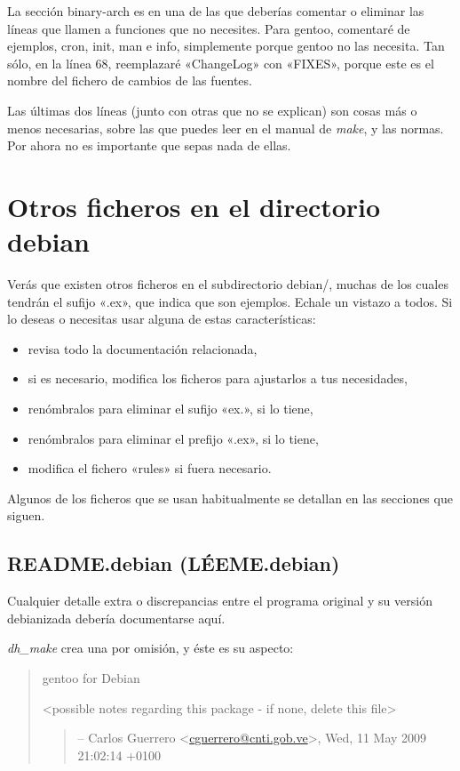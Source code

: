 \documentclass[letterpaper,12pt,spanish]{manual}
\begin{document}
La sección binary-arch es en una de las que deberías comentar o eliminar las líneas que llamen a funciones que no necesites. Para gentoo, comentaré de ejemplos, cron, init, man e info, simplemente porque gentoo no las necesita. Tan sólo, en la línea 68, reemplazaré «ChangeLog» con «FIXES», porque este es el nombre del fichero de cambios de las fuentes.

Las últimas dos líneas (junto con otras que no se explican) son cosas más o menos necesarias, sobre las que puedes leer en el manual de \emph{make}, y las normas. Por ahora no es importante que sepas nada de ellas.


\section{\textbf{Otros ficheros en el directorio debian}}

Verás que existen otros ficheros en el subdirectorio debian/, muchas de los cuales tendrán el sufijo «.ex», que indica que son ejemplos. Echale un vistazo a todos. Si lo deseas o necesitas usar alguna de estas características:
\begin{itemize}
\item {} 
revisa todo la documentación relacionada,

\item {} 
si es necesario, modifica los ficheros para ajustarlos a tus necesidades,

\item {} 
renómbralos para eliminar el sufijo «ex.», si lo tiene,

\item {} 
renómbralos para eliminar el prefijo «.ex», si lo tiene,

\item {} 
modifica el fichero «rules» si fuera necesario.

\end{itemize}

Algunos de los ficheros que se usan habitualmente se detallan en las secciones que siguen.


\subsection{README.debian (LÉEME.debian)}

Cualquier detalle extra o discrepancias entre el programa original y su versión debianizada debería documentarse aquí.

\emph{dh\_make} crea una por omisión, y éste es su aspecto:
\begin{quote}

gentoo for Debian

\textless{}possible notes regarding this package - if none, delete this file\textgreater{}
\begin{quote}

-- Carlos Guerrero \textless{}\href{mailto:cguerrero@cnti.gob.ve}{cguerrero@cnti.gob.ve}\textgreater{}, Wed, 11 May 2009 21:02:14 +0100
\end{quote}
\end{quote}
\end{document}
